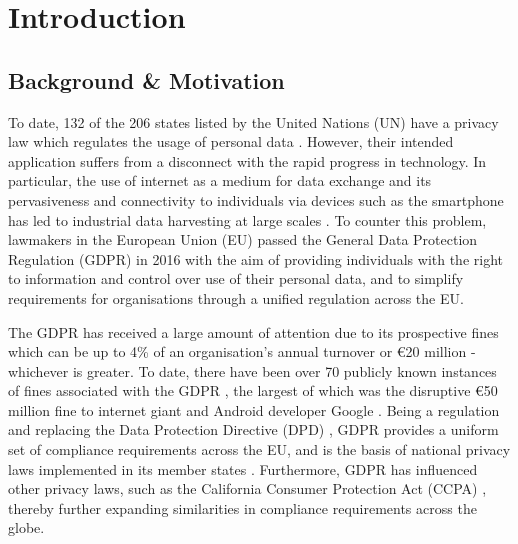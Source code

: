 \chapter{Introduction}
\label{chapter:introduction}

\section{Background \& Motivation}\label{sec:intro:background}
To date, 132 of the 206 states listed by the United Nations (UN) have a privacy law which regulates the usage of personal data \cite{greenleaf_global_2019-1}.
However, their intended application suffers from a disconnect with the rapid progress in technology. In particular, the use of internet as a medium for data exchange and its pervasiveness and connectivity to individuals via devices such as the smartphone has led to industrial data harvesting at large scales \cite{christl_networks_2016}. 
To counter this problem, lawmakers in the European Union (EU) passed the General Data Protection Regulation (GDPR) \cite{Regulation_GDPR} in 2016 with the aim of providing individuals with the right to information and control over use of their personal data, and to simplify requirements for organisations through a unified regulation across the EU.

The GDPR has received a large amount of attention due to its prospective fines which can be up to 4\% of an organisation's annual turnover or €20 million - whichever is greater. 
To date, there have been over 70 publicly known instances of fines associated with the GDPR \cite{GDPR_fines_tracker}, the largest of which was the disruptive €50 million fine to internet giant and Android developer Google \cite{CNIL_GOOGLE_2019}.
Being a regulation and replacing the Data Protection Directive (DPD) \cite{directive_DPD}, GDPR provides a uniform set of compliance requirements across the EU, and is the basis of national privacy laws implemented in its member states \cite{mccullagh_national_2019}.
Furthermore, GDPR has influenced other privacy laws, such as the California Consumer Protection Act (CCPA) \cite{CCPA}, thereby further expanding similarities in compliance requirements across the globe.

